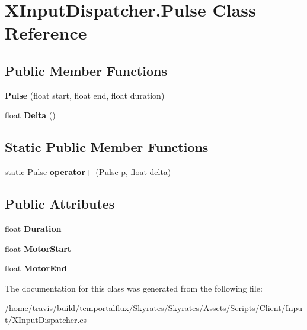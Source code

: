 \hypertarget{class_x_input_dispatcher_1_1_pulse}{\section{X\-Input\-Dispatcher.\-Pulse Class Reference}
\label{class_x_input_dispatcher_1_1_pulse}
}
\subsection*{Public Member Functions}
\begin{DoxyCompactItemize}
\item 
\hypertarget{class_x_input_dispatcher_1_1_pulse_a3f853289b09bda6c3c9887c6b29fada3}{{\bfseries Pulse} (float start, float end, float duration)}\label{class_x_input_dispatcher_1_1_pulse_a3f853289b09bda6c3c9887c6b29fada3}

\item 
\hypertarget{class_x_input_dispatcher_1_1_pulse_ac8699214026bb1917ee60e941d4b8f65}{float {\bfseries Delta} ()}\label{class_x_input_dispatcher_1_1_pulse_ac8699214026bb1917ee60e941d4b8f65}

\end{DoxyCompactItemize}
\subsection*{Static Public Member Functions}
\begin{DoxyCompactItemize}
\item 
\hypertarget{class_x_input_dispatcher_1_1_pulse_adc242fffae12520c82ebb7f13058f237}{static \hyperlink{class_x_input_dispatcher_1_1_pulse}{Pulse} {\bfseries operator+} (\hyperlink{class_x_input_dispatcher_1_1_pulse}{Pulse} p, float delta)}\label{class_x_input_dispatcher_1_1_pulse_adc242fffae12520c82ebb7f13058f237}

\end{DoxyCompactItemize}
\subsection*{Public Attributes}
\begin{DoxyCompactItemize}
\item 
\hypertarget{class_x_input_dispatcher_1_1_pulse_a4f82a3914718a35a9a32e7ffff335fd3}{float {\bfseries Duration}}\label{class_x_input_dispatcher_1_1_pulse_a4f82a3914718a35a9a32e7ffff335fd3}

\item 
\hypertarget{class_x_input_dispatcher_1_1_pulse_ac8057fa3ddd96c51ef58f99200f8122a}{float {\bfseries Motor\-Start}}\label{class_x_input_dispatcher_1_1_pulse_ac8057fa3ddd96c51ef58f99200f8122a}

\item 
\hypertarget{class_x_input_dispatcher_1_1_pulse_a733a9ab77011e7b64fcd96ee8512b497}{float {\bfseries Motor\-End}}\label{class_x_input_dispatcher_1_1_pulse_a733a9ab77011e7b64fcd96ee8512b497}

\end{DoxyCompactItemize}


The documentation for this class was generated from the following file\-:\begin{DoxyCompactItemize}
\item 
/home/travis/build/temportalflux/\-Skyrates/\-Skyrates/\-Assets/\-Scripts/\-Client/\-Input/X\-Input\-Dispatcher.\-cs\end{DoxyCompactItemize}
